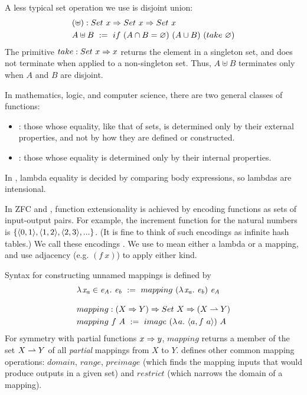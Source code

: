 A less typical set operation we use is disjoint union:
\begin{equation}
\begin{aligned}
	&(\uplus) : Set~x \Rightarrow Set~x \Rightarrow Set~x \\
	&A \uplus B \ := \ if~(A \cap B = \varnothing)~(A \cup B)~(take~\varnothing)
\end{aligned}
\end{equation}
The primitive $take : Set~x \Rightarrow x$ returns the element in a singleton set, and does not terminate when applied to a non-singleton set.
Thus, $A \uplus B$ terminates only when $A$ and $B$ are disjoint.

In mathematics, logic, and computer science, there are two general classes of functions:
\begin{itemize}
	\item {}: those whose equality, like that of sets, is determined only by their external properties, and not by how they are defined or constructed.
	\item {}: those whose equality is determined only by their internal properties.
\end{itemize}

In \lzfclang, lambda equality is decided by comparing body expressions, so lambdas are intensional.

In ZFC and \lzfclang, function extensionality is achieved by encoding functions as sets of input-output pairs.
For example, the increment function for the natural numbers is $\{{\langle{0,1}\rangle,\langle{1,2}\rangle,\langle{2,3}\rangle,...}\}$.
(It is fine to think of such encodings as infinite hash tables.)
We call these encodings .
We use  to mean either a lambda or a mapping, and use adjacency (e.g. $(f~x)$) to apply either kind.

Syntax for constructing unnamed mappings is defined by
\begin{align}
	&\fun{\mathit{x_a} \in \mathit{e_A}}{\mathit{e_b}} \ :=\ mapping~(\fun{\mathit{x_a}}\mathit{e_b})~\mathit{e_A} \\
\nonumber\\[-0.5\baselineskip]
	&\begin{aligned}
		&mapping : (X \tto Y) \tto Set~X \tto (X \pto Y) \\
		&mapping~f~A \ := \ image~(\fun{a}{\pair{a,f~a}})~A
	\end{aligned}
\end{align}
For symmetry with partial functions $x \Rightarrow y$, $mapping$ returns a member of the set $X \rightharpoonup Y$ of all \emph{partial} mappings from $X$ to $Y$.
 defines other common mapping operations: $domain$, $range$, $preimage$ (which finds the mapping inputs that would produce outputs in a given set) and $restrict$ (which narrows the domain of a mapping).


